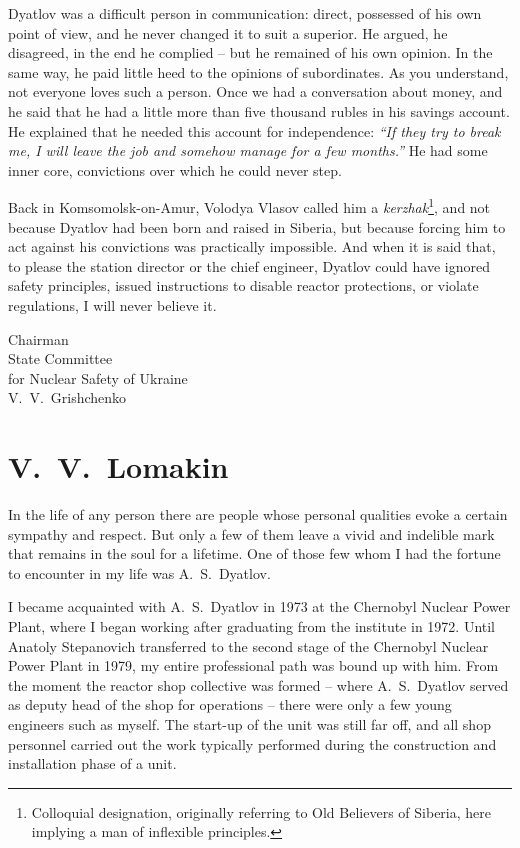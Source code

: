 \documentclass[openright]{bookest}
\begin{document}
Dyatlov was a difficult person in communication: direct, possessed of his own point of view, and he never changed it to suit a superior. He argued, he disagreed, in the end he complied -- but he remained of his own opinion. In the same way, he paid little heed to the opinions of subordinates. As you understand, not everyone loves such a person. Once we had a conversation about money, and he said that he had a little more than five thousand rubles in his savings account. He explained that he needed this account for independence: \textit{``If they try to break me, I will leave the job and somehow manage for a few months.''} He had some inner core, convictions over which he could never step.

Back in Komsomolsk-on-Amur, Volodya Vlasov called him a \textit{kerzhak}\footnote{Colloquial designation, originally referring to Old Believers of Siberia, here implying a man of inflexible principles.}, and not because Dyatlov had been born and raised in Siberia, but because forcing him to act against his convictions was practically impossible. And when it is said that, to please the station director or the chief engineer, Dyatlov could have ignored safety principles, issued instructions to disable reactor protections, or violate regulations, I will never believe it.

\begin{flushright}
Chairman\\
State Committee\\
for Nuclear Safety of Ukraine\\[0.5\baselineskip]
V.~V.~Grishchenko
\end{flushright}

\section*{V.~V.~Lomakin}

In the life of any person there are people whose personal qualities evoke a certain sympathy and respect. But only a few of them leave a vivid and indelible mark that remains in the soul for a lifetime. One of those few whom I had the fortune to encounter in my life was A.~S.~Dyatlov.

I became acquainted with A.~S.~Dyatlov in 1973 at the Chernobyl Nuclear Power Plant, where I began working after graduating from the institute in 1972. Until Anatoly Stepanovich transferred to the second stage of the Chernobyl Nuclear Power Plant in 1979, my entire professional path was bound up with him. From the moment the reactor shop collective was formed -- where A.~S.~Dyatlov served as deputy head of the shop for operations -- there were only a few young engineers such as myself. The start-up of the unit was still far off, and all shop personnel carried out the work typically performed during the construction and installation phase of a unit.
\end{document}

